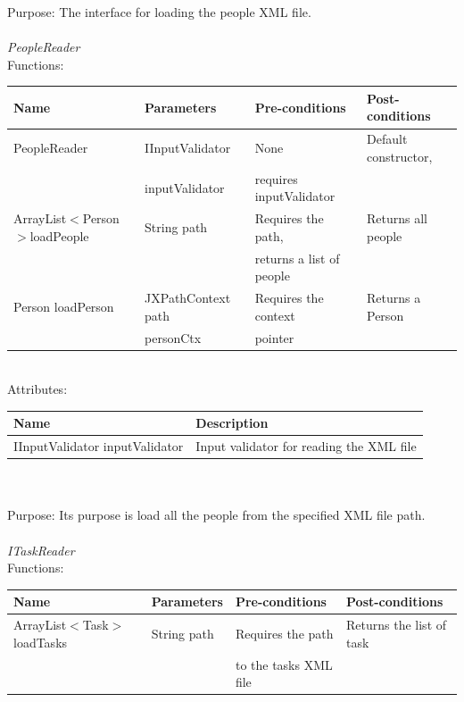 Purpose: The interface for loading the people XML file.
\\
\\
\emph{PeopleReader}\\
Functions:\\
\begin{tabular}{| l | l | l | l |}
\hline
Name & Parameters & Pre-conditions & Post-conditions\\
\hline
		PeopleReader				& IInputValidator 	& None				& Default constructor, \\
							& inputValidator	&  requires inputValidator	& \\
\hline
		ArrayList$<$Person$>$loadPeople 	& String path       	& Requires the path,		& Returns all people\\
                                                                                    &                         	& returns a list of people 	 &\\
\hline
		Person loadPerson 			& JXPathContext path & Requires the context	& Returns a Person \\
                                                                                    & personCtx                & pointer			& 
\\
\hline
\end{tabular}
\\

Attributes:\\
\begin{tabular}{| l | l |}
\hline
 Name                                     	 	& Description\\
\hline
IInputValidator inputValidator		& Input validator for reading the XML file\\
\hline
\end{tabular}\\
\\

Purpose: Its purpose is load all the people from the specified XML file path.
\\
\\

\emph{ITaskReader}\\
Functions:\\
\begin{tabular}{| l | l | l | l |}
\hline
Name & Parameters & Pre-conditions & Post-conditions\\
\hline
		ArrayList$<$Task$>$loadTasks 	& String path       			& Requires the path 	& Returns the list of task\\
                                                                                    &                         			 & to the tasks XML file	& 
\\
\hline
\end{tabular}
\\

